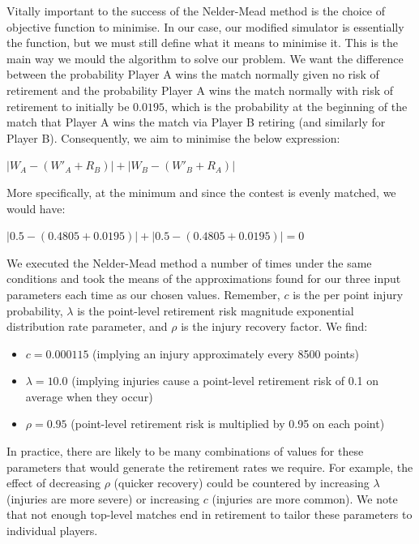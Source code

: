 \documentclass[authoryear, 12pt]{elsarticle}
\begin{document}
Vitally important to the success of the Nelder-Mead method is the choice of objective function to minimise.  In our case, our modified simulator is essentially the function, but we must still define what it means to minimise it.  This is the main way we mould the algorithm to solve our problem.  We want the difference between the probability Player A wins the match normally given no risk of retirement and the probability Player A wins the match normally with risk of retirement to initially be $0.0195$, which is the probability at the beginning of the match that Player A wins the match via Player B retiring (and similarly for Player B).  Consequently, we aim to minimise the below expression:

\begin{center}
	$\left|W_A - (W'_A + R_B)\right| + \left|W_B - (W'_B + R_A)\right|$
\end{center}

More specifically, at the minimum and since the contest is evenly matched, we would have:

\begin{center}
	$\left|0.5 - (0.4805 + 0.0195)\right| + \left|0.5 - (0.4805 + 0.0195)\right| = 0$
\end{center}

We executed the Nelder-Mead method a number of times under the same conditions and took the means of the approximations found for our three input parameters each time as our chosen values.  Remember, $c$ is the per point injury probability, $\lambda$ is the point-level retirement risk magnitude exponential distribution rate parameter, and $\rho$ is the injury recovery factor.  We find:

\begin{itemize}
	\item $c = 0.000115$ (implying an injury approximately every 8500 points)
	\item $\lambda = 10.0$ (implying injuries cause a point-level retirement risk of 0.1 on average when they occur)
	\item $\rho = 0.95$ (point-level retirement risk is multiplied by 0.95 on each point)
\end{itemize}

In practice, there are likely to be many combinations of values for these parameters that would generate the retirement rates we require.  For example, the effect of decreasing $\rho$ (quicker recovery) could be countered by increasing $\lambda$ (injuries are more severe) or increasing $c$ (injuries are more common). We note that not enough top-level matches end in retirement to tailor these parameters to individual players.
\end{document}
